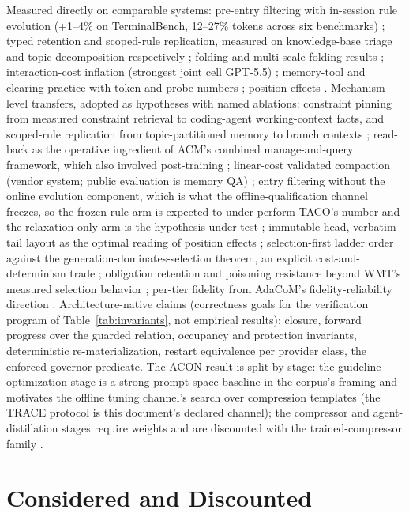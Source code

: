 \documentclass[11pt]{article}
\begin{document}
Measured directly on comparable systems: pre-entry filtering with in-session rule evolution (+1--4\% on TerminalBench, 12--27\% tokens across six benchmarks) \cite{taco2026}; typed retention and scoped-rule replication, measured on knowledge-base triage and topic decomposition respectively \cite{cliff2026}; folding and multi-scale folding results \cite{folding2026,agentfold2026}; interaction-cost inflation (strongest joint cell GPT-5.5) \cite{interact2026}; memory-tool and clearing practice with token and probe numbers \cite{anthropic2026cookbook,anthropic2026docs,dream2026}; position effects \cite{lost2024}. Mechanism-level transfers, adopted as hypotheses with named ablations: constraint pinning from measured constraint retrieval to coding-agent working-context facts, and scoped-rule replication from topic-partitioned memory to branch contexts \cite{cliff2026}; read-back as the operative ingredient of ACM's combined manage-and-query framework, which also involved post-training \cite{acm2026}; linear-cost validated compaction (vendor system; public evaluation is memory QA) \cite{lifecycle2026}; entry filtering without the online evolution component, which is what the offline-qualification channel freezes, so the frozen-rule arm is expected to under-perform TACO's number and the relaxation-only arm is the hypothesis under test \cite{taco2026}; immutable-head, verbatim-tail layout as the optimal reading of position effects \cite{lost2024}; selection-first ladder order against the generation-dominates-selection theorem, an explicit cost-and-determinism trade \cite{theory2026}; obligation retention and poisoning resistance beyond WMT's measured selection behavior \cite{wmt2026}; per-tier fidelity from AdaCoM's fidelity-reliability direction \cite{adacom2026}. Architecture-native claims (correctness goals for the verification program of Table~\ref{tab:invariants}, not empirical results): closure, forward progress over the guarded relation, occupancy and protection invariants, deterministic re-materialization, restart equivalence per provider class, the enforced governor predicate. The ACON result is split by stage: the guideline-optimization stage is a strong prompt-space baseline in the corpus's framing and motivates the offline tuning channel's search over compression templates (the TRACE protocol is this document's declared channel); the compressor and agent-distillation stages require weights and are discounted with the trained-compressor family \cite{acon2026,trace2026}.

\section{Considered and Discounted}
\end{document}
